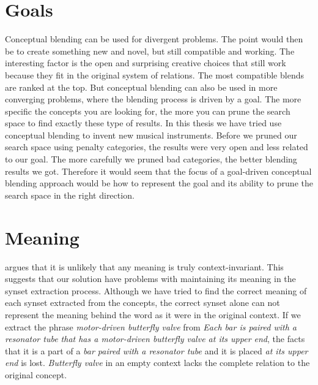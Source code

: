 
\section{Goals}
Conceptual blending can be used for divergent problems. The point would then be to create something new and novel, but still compatible and working. The interesting factor is the open and surprising creative choices that still work because they fit in the original system of relations. The most compatible blends are ranked at the top. But conceptual blending can also be used in more converging problems, where the blending process is driven by a goal. The more specific the concepts you are looking for, the more you can prune the search space to find exactly these type of results. In this thesis we have tried use conceptual blending to invent new musical instruments. Before we pruned our search space using penalty categories, the results were very open and less related to our goal. The more carefully we pruned bad categories, the better blending results we got. Therefore it would seem that the focus of a goal-driven conceptual blending approach would be how to represent the goal and its ability to prune the search space in the right direction.


\section{Meaning}
\parencite{Reference5} argues that it is unlikely that any meaning is truly context-invariant. This suggests that our solution have problems with maintaining its meaning in the synset extraction process. Although we have tried to find the correct meaning of each synset extracted from the concepts, the correct synset alone can not represent the meaning behind the word as it were in the original context. If we extract the phrase \emph{motor-driven butterfly valve} from \emph{Each bar is paired with a resonator tube that has a motor-driven butterfly valve at its upper end}, the facts that it is a part of a \emph{bar paired with a resonator tube} and it is placed \emph{at its upper end} is lost. \emph{Butterfly valve} in an empty context lacks the complete relation to the original concept.


